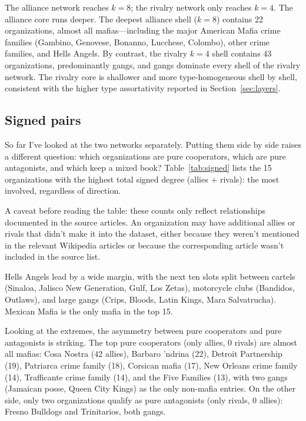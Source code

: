 \documentclass[11pt,a4paper]{article}
\begin{document}
The alliance network reaches $k=8$; the rivalry network only reaches $k=4$. The alliance core runs deeper. The deepest alliance shell ($k=8$) contains 22 organizations, almost all mafias---including the major American Mafia crime families (Gambino, Genovese, Bonanno, Lucchese, Colombo), other crime families, and Hells Angels. By contrast, the rivalry $k=4$ shell contains 43 organizations, predominantly gangs, and gangs dominate every shell of the rivalry network. The rivalry core is shallower and more type-homogeneous shell by shell, consistent with the higher type assortativity reported in Section~\ref{sec:layers}.

\subsection{Signed pairs}\label{sec:signed}

So far I've looked at the two networks separately. Putting them side by side raises a different question: which organizations are pure cooperators, which are pure antagonists, and which keep a mixed book? Table~\ref{tab:signed} lists the 15 organizations with the highest total signed degree (allies $+$ rivals): the most involved, regardless of direction.

A caveat before reading the table: these counts only reflect relationships documented in the source articles. An organization may have additional allies or rivals that didn't make it into the dataset, either because they weren't mentioned in the relevant Wikipedia articles or because the corresponding article wasn't included in the source list.

Hells Angels lead by a wide margin, with the next ten slots split between cartels (Sinaloa, Jalisco New Generation, Gulf, Los Zetas), motorcycle clubs (Bandidos, Outlaws), and large gangs (Crips, Bloods, Latin Kings, Mara Salvatrucha). Mexican Mafia is the only mafia in the top 15. 

Looking at the extremes, the asymmetry between pure cooperators and pure antagonists is striking. The top pure cooperators (only allies, 0 rivals) are almost all mafias: Cosa Nostra (42 allies), Barbaro 'ndrina (22), Detroit Partnership (19), Patriarca crime family (18), Corsican mafia (17), New Orleans crime family (14), Trafficante crime family (14), and the Five Families (13), with two gangs (Jamaican posse, Queen City Kings) as the only non-mafia entries. On the other side, only two organizations qualify as pure antagonists (only rivals, 0 allies): Fresno Bulldogs and Trinitarios, both gangs. 
\end{document}
